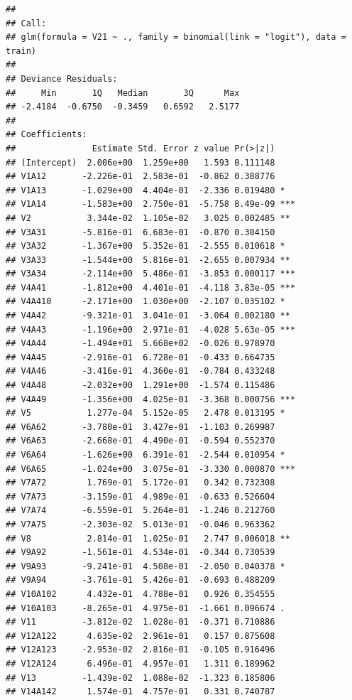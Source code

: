 \documentclass[]{article}
\begin{document}
\begin{verbatim}
## 
## Call:
## glm(formula = V21 ~ ., family = binomial(link = "logit"), data = train)
## 
## Deviance Residuals: 
##     Min       1Q   Median       3Q      Max  
## -2.4184  -0.6750  -0.3459   0.6592   2.5177  
## 
## Coefficients:
##               Estimate Std. Error z value Pr(>|z|)    
## (Intercept)  2.006e+00  1.259e+00   1.593 0.111148    
## V1A12       -2.226e-01  2.583e-01  -0.862 0.388776    
## V1A13       -1.029e+00  4.404e-01  -2.336 0.019480 *  
## V1A14       -1.583e+00  2.750e-01  -5.758 8.49e-09 ***
## V2           3.344e-02  1.105e-02   3.025 0.002485 ** 
## V3A31       -5.816e-01  6.683e-01  -0.870 0.384150    
## V3A32       -1.367e+00  5.352e-01  -2.555 0.010618 *  
## V3A33       -1.544e+00  5.816e-01  -2.655 0.007934 ** 
## V3A34       -2.114e+00  5.486e-01  -3.853 0.000117 ***
## V4A41       -1.812e+00  4.401e-01  -4.118 3.83e-05 ***
## V4A410      -2.171e+00  1.030e+00  -2.107 0.035102 *  
## V4A42       -9.321e-01  3.041e-01  -3.064 0.002180 ** 
## V4A43       -1.196e+00  2.971e-01  -4.028 5.63e-05 ***
## V4A44       -1.494e+01  5.668e+02  -0.026 0.978970    
## V4A45       -2.916e-01  6.728e-01  -0.433 0.664735    
## V4A46       -3.416e-01  4.360e-01  -0.784 0.433248    
## V4A48       -2.032e+00  1.291e+00  -1.574 0.115486    
## V4A49       -1.356e+00  4.025e-01  -3.368 0.000756 ***
## V5           1.277e-04  5.152e-05   2.478 0.013195 *  
## V6A62       -3.780e-01  3.427e-01  -1.103 0.269987    
## V6A63       -2.668e-01  4.490e-01  -0.594 0.552370    
## V6A64       -1.626e+00  6.391e-01  -2.544 0.010954 *  
## V6A65       -1.024e+00  3.075e-01  -3.330 0.000870 ***
## V7A72        1.769e-01  5.172e-01   0.342 0.732308    
## V7A73       -3.159e-01  4.989e-01  -0.633 0.526604    
## V7A74       -6.559e-01  5.264e-01  -1.246 0.212760    
## V7A75       -2.303e-02  5.013e-01  -0.046 0.963362    
## V8           2.814e-01  1.025e-01   2.747 0.006018 ** 
## V9A92       -1.561e-01  4.534e-01  -0.344 0.730539    
## V9A93       -9.241e-01  4.508e-01  -2.050 0.040378 *  
## V9A94       -3.761e-01  5.426e-01  -0.693 0.488209    
## V10A102      4.432e-01  4.788e-01   0.926 0.354555    
## V10A103     -8.265e-01  4.975e-01  -1.661 0.096674 .  
## V11         -3.812e-02  1.028e-01  -0.371 0.710886    
## V12A122      4.635e-02  2.961e-01   0.157 0.875608    
## V12A123     -2.953e-02  2.816e-01  -0.105 0.916496    
## V12A124      6.496e-01  4.957e-01   1.311 0.189962    
## V13         -1.439e-02  1.088e-02  -1.323 0.185806    
## V14A142      1.574e-01  4.757e-01   0.331 0.740787    

\end{verbatim}
\end{document}
